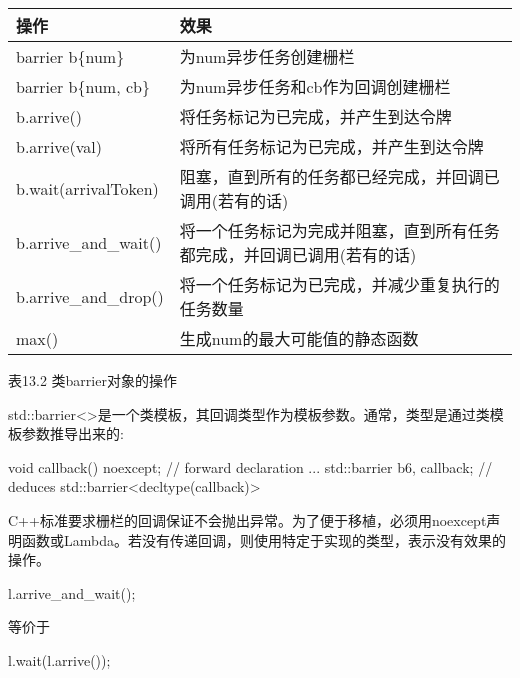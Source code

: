 \begin{longtable}[c]{|l|l|}
\hline
\textbf{操作} & \textbf{效果}                                                 \\ \hline
\endfirsthead
%
\endhead
%
barrier b\{num\}   & 为num异步任务创建栅栏                    \\ \hline
barrier b\{num, cb\}  & 为num异步任务和cb作为回调创建栅栏                                                \\ \hline
b.arrive()         & 将任务标记为已完成，并产生到达令牌              \\ \hline
b.arrive(val)      & 将所有任务标记为已完成，并产生到达令牌             \\ \hline
b.wait(arrivalToken)  & 阻塞，直到所有的任务都已经完成，并回调已调用(若有的话)                        \\ \hline
b.arrive\_and\_wait() & 将一个任务标记为完成并阻塞，直到所有任务都完成，并回调已调用(若有的话) \\ \hline
b.arrive\_and\_drop() & 将一个任务标记为已完成，并减少重复执行的任务数量                                \\ \hline
max()              & 生成num的最大可能值的静态函数 \\ \hline
\end{longtable}

\begin{center}
表13.2 类barrier对象的操作
\end{center}

std::barrier<>是一个类模板，其回调类型作为模板参数。通常，类型是通过类模板参数推导出来的:

\begin{cpp}
void callback() noexcept; // forward declaration
...
std::barrier b{6, callback}; // deduces std::barrier<decltype(callback)>
\end{cpp}

C++标准要求栅栏的回调保证不会抛出异常。为了便于移植，必须用noexcept声明函数或Lambda。若没有传递回调，则使用特定于实现的类型，表示没有效果的操作。

\begin{cpp}
l.arrive_and_wait();
\end{cpp}

等价于

\begin{cpp}
l.wait(l.arrive());
\end{cpp}

